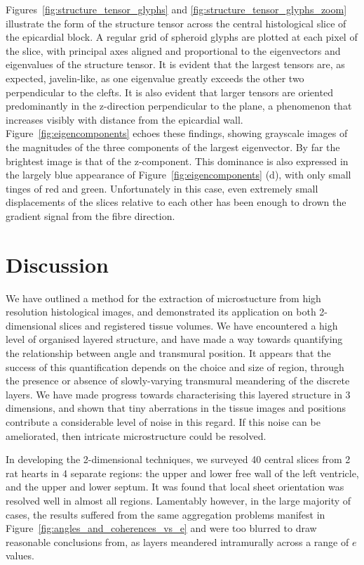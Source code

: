     Figures~\ref{fig:structure_tensor_glyphs} and \ref{fig:structure_tensor_glyphs_zoom} illustrate the form of the structure tensor across the central histological slice of the epicardial block. A regular grid of spheroid glyphs are plotted at each pixel of the slice, with principal axes aligned and proportional to the eigenvectors and eigenvalues of the structure tensor. It is evident that the largest tensors are, as expected, javelin-like, as one eigenvalue greatly exceeds the other two perpendicular to the clefts. It is also evident that larger tensors are oriented predominantly in the z-direction perpendicular to the plane, a phenomenon that increases visibly with distance from the epicardial wall. Figure~\ref{fig:eigencomponents} echoes these findings, showing grayscale images of the magnitudes of the three components of the largest eigenvector. By far the brightest image is that of the z-component. This dominance is also expressed in the largely blue appearance of Figure~\ref{fig:eigencomponents} (d), with only small tinges of red and green. Unfortunately in this case, even extremely small displacements of the slices relative to each other has been enough to drown the gradient signal from the fibre direction.
  

\section{Discussion} %
  We have outlined a method for the extraction of microstucture from high resolution histological images, and demonstrated its application on both 2-dimensional slices and registered tissue volumes. We have encountered a high level of organised layered structure, and have made a way towards quantifying the relationship between angle and transmural position. It appears that the success of this quantification depends on the choice and size of region, through the presence or absence of slowly-varying transmural meandering of the discrete layers. We have made progress towards characterising this layered structure in 3 dimensions, and shown that tiny aberrations in the tissue images and positions contribute a considerable level of noise in this regard. If this noise can be ameliorated, then intricate microstructure could be resolved.
  
  In developing the 2-dimensional techniques, we surveyed 40 central slices from 2 rat hearts in 4 separate regions: the upper and lower free wall of the left ventricle, and the upper and lower septum. It was found that local sheet orientation was resolved well in almost all regions. Lamentably however, in the large majority of cases, the results suffered from the same aggregation problems manifest in Figure~\ref{fig:angles_and_coherences_vs_e} and were too blurred to draw reasonable conclusions from, as layers meandered intramurally across a range of $e$ values.
  
